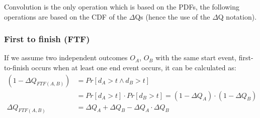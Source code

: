         Convolution is the only operation which is based on the PDFs, the following operations are based on the CDF of the $\Delta$Qs (hence the use of the $\Delta$Q notation).
        
    \subsubsection{First to finish (FTF)}
            If we assume two independent outcomes $O_A$, $O_B$ with the same start event, first-to-finish occurs when at least one end event occurs, it can be calculated as:
        \begin{equation}
            \begin{split}
                (1 - \Delta Q_{FTF(A, B)}) &= Pr[d_A > t \wedge d_B > t] \\
                & = Pr[d_A > t] \cdot Pr[d_B > t] = (1 - \Delta Q_A) \cdot (1 - \Delta Q_B) \\
                \Delta Q_{FTF(A, B)} &= \Delta Q_A + \Delta Q_B - \Delta Q_A \cdot \Delta Q_B  
            \end{split}    
            \label{eq:ftf} 
        \end{equation}

